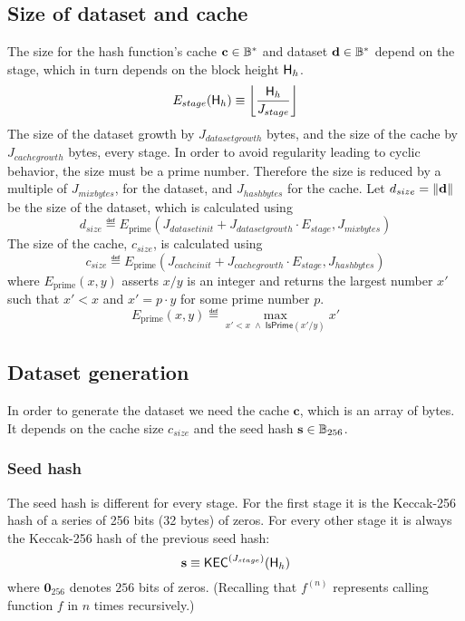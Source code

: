 \subsection{Size of dataset and cache}
The size for the hash function's cache $\mathbf{c} \in \mathbb{B}^*$  and dataset $\mathbf{d} \in \mathbb{B}^*$ depend on the stage, which in turn depends on the block height $\textsf{H}_{h}$.
\begin{equation} %
 E_{stage}(\head_{h}) \eqdef \left\lfloor\frac{\head_{h}}{J_{stage}}\right\rfloor
\end{equation}
The size of the dataset growth by $J_{datasetgrowth}$ bytes, and the size of the cache by $J_{cachegrowth}$ bytes, every stage. In order to avoid regularity leading to cyclic behavior, the size must be a prime number. Therefore the size is reduced by a multiple of $J_{mixbytes}$, for the dataset, and $J_{hashbytes}$ for the cache.
Let $d_{size} = \lVert\mathbf{d} \rVert$ be the size of the dataset, 
which is calculated using
\begin{equation}
 d_{size} \eqdef E_{\mathrm{prime}}(J_{datasetinit} + J_{datasetgrowth} \cdot E_{stage}, J_{mixbytes})
\end{equation}
The size of the cache, $c_{size}$, is calculated using
\begin{equation}
 c_{size} \eqdef E_{\mathrm{prime}}(J_{cacheinit} + J_{cachegrowth} \cdot E_{stage}, J_{hashbytes})
\end{equation}
where $E_{\mathrm{prime}}(x, y)$ asserts $x/y$ is an integer and returns the largest number $x'$ such that $x'<x$ and $x'=p\cdot y$ for some prime number $p$. 
\begin{equation}
	E_{\mathrm{prime}}(x, y) \eqdef \max_{x'<x\;\wedge\;\mathsf{IsPrime}(x'/y)} x'
\end{equation}
\subsection{Dataset generation}
In order to generate the dataset we need the cache $\mathbf{c}$, which is an array of bytes. It depends on the cache size  $c_{size}$ and the seed hash $\mathbf{s} \in \mathbb{B}_{256}$.
\subsubsection{Seed hash}
The seed hash is different for every stage. For the first stage it is the Keccak-256 hash of a series of 256 bits (32 bytes) of zeros. For every other stage it is always the Keccak-256 hash of the previous seed hash:
\begin{equation}
 \mathbf{s} \equiv \mathsf{KEC}^{(J_{stage})}(\textsf{H}_{h})
\end{equation}
where $\mathbf{0}_{256}$ denotes $256$ bits of zeros. (Recalling that $f^{(n)}$ represents calling function $f$ in $n$ times recursively.)

